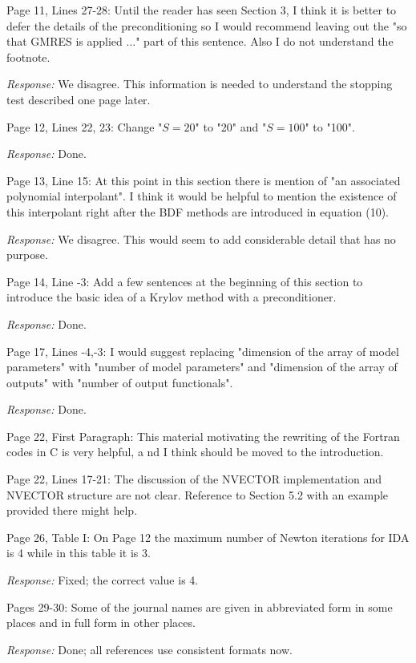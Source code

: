 \documentclass[12pt]{letter}
\begin{document}
Page 11, Lines 27-28: Until the reader has seen Section 3, I think it
is better to defer the details of the preconditioning so I would
recommend leaving out the "so that GMRES is applied ..."  part of this
sentence. Also I do not understand the footnote.

{\em Response:} We disagree.  This information is needed to understand
the stopping test described one page later.

Page 12, Lines 22, 23: Change "$S = 20$" to "20" and "$S = 100$" to "100".

{\em Response:} Done.

Page 13, Line 15: At this point in this section there is mention of "an
associated polynomial interpolant".  I think it would be helpful to
mention the existence of this interpolant right after the BDF methods
are introduced in equation (10).

{\em Response:} We disagree.  This would seem to add considerable
detail that has no purpose.

Page 14, Line -3: Add a few sentences at the beginning of this section
to introduce the basic idea of a Krylov method with a preconditioner.

{\em Response:} Done.

Page 17, Lines -4,-3: I would suggest replacing "dimension of the array
of model parameters" with "number of model parameters" and "dimension of
the array of outputs" with "number of output functionals".

{\em Response:} Done.

Page 22, First Paragraph: This material motivating the rewriting of
the Fortran codes in C is very helpful, a nd I think should be moved
to the introduction.

Page 22, Lines 17-21: The discussion of the NVECTOR implementation and
NVECTOR structure are not clear.  Reference to Section 5.2 with an
example provided there might help.

Page 26, Table I: On Page 12 the maximum number of Newton iterations
for IDA is 4 while in this table it is 3.

{\em Response:} Fixed; the correct value is 4.

Pages 29-30: Some of the journal names are given in abbreviated form
in some places and in full form in other places.

{\em Response:} Done; all references use consistent formats now.
\end{document}
